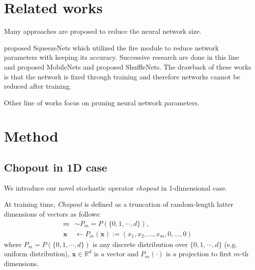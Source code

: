 \documentclass{article}
\begin{document}
    \section{Related works}
    \label{related_works}
    Many approaches are proposed to reduce the neural network size. 
    
    \citet{iandola2016squeezenet} proposed SqueezeNets which utilized the fire module to reduce network parameters with keeping its accuracy. Successive research are done in this line and \citet{howard2017mobilenet} proposed MobileNets and \citet{zhang2017shufflenet} proposed ShuffleNets. The drawback of these works is that the network is fixed through training and therefore networks cannot be reduced after training.

    Other line of works focus on pruning neural network parameters. \citet{han2015learning} 
    
    \section{Method}
    \label{sec:method}
    
    \subsection{Chopout in 1D case}
    \label{subsec:chopout-1d}
    
    We introduce our novel stochastic operator \textit{chopout} in 1-dimensional case. 
    
    At training time, \textit{Chopout} is defined as a truncation of random-length latter dimensions of vectors as follows:
    \begin{align}
        m &\sim P_m = P(\{0, 1, \cdots, d\}), \nonumber \\
        \mathbf{x} &\leftarrow P_m(\mathbf{x}) := (x_1, x_2, ..., x_m, 0, ..., 0)
    \end{align}
    where $P_m = P(\{0, 1, \cdots, d\})$ is any discrete distribution over $\{0, 1, \cdots, d\}$ (e.g. uniform distribution), $\mathbf{x} \in \mathbb{R}^d$ is a vector and $P_m(\cdot)$ is a projection to first $m$-th dimensions. 
    
\end{document}
